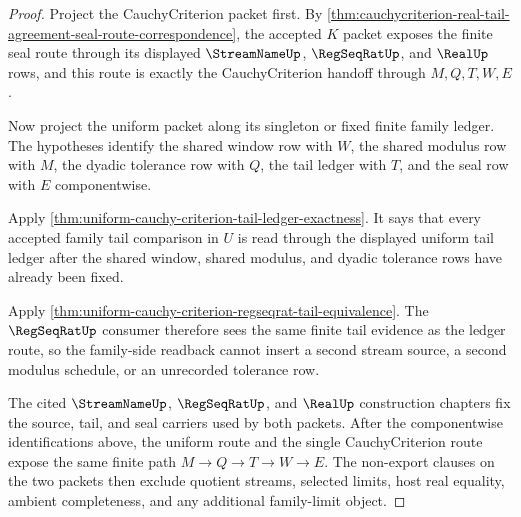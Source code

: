 \begin{proof}
Project the CauchyCriterion packet first. By
\autoref{thm:cauchycriterion-real-tail-agreement-seal-route-correspondence},
the accepted $K$ packet exposes the finite seal route through its displayed
$\StreamNameUp$, $\RegSeqRatUp$, and $\RealUp$ rows, and this route is exactly
the CauchyCriterion handoff through $M,Q,T,W,E$.

Now project the uniform packet along its singleton or fixed finite family
ledger. The hypotheses identify the shared window row with $W$, the shared
modulus row with $M$, the dyadic tolerance row with $Q$, the tail ledger with
$T$, and the seal row with $E$ componentwise.

Apply \autoref{thm:uniform-cauchy-criterion-tail-ledger-exactness}. It says
that every accepted family tail comparison in $U$ is read through the displayed
uniform tail ledger after the shared window, shared modulus, and dyadic
tolerance rows have already been fixed.

Apply \autoref{thm:uniform-cauchy-criterion-regseqrat-tail-equivalence}. The
$\RegSeqRatUp$ consumer therefore sees the same finite tail evidence as the
ledger route, so the family-side readback cannot insert a second stream source,
a second modulus schedule, or an unrecorded tolerance row.

The cited $\StreamNameUp$, $\RegSeqRatUp$, and $\RealUp$ construction chapters
fix the source, tail, and seal carriers used by both packets. After the
componentwise identifications above, the uniform route and the single
CauchyCriterion route expose the same finite path $M\to Q\to T\to W\to E$.
The non-export clauses on the two packets then exclude quotient streams,
selected limits, host real equality, ambient completeness, and any additional
family-limit object.
\end{proof}

